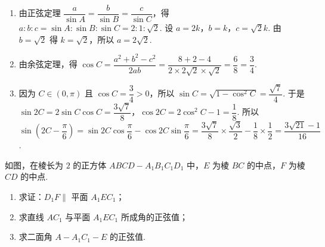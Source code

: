 \begin{solution}
\begin{enumerate}
\item 由正弦定理 \(\dfrac a{\sin A}=\dfrac b{\sin B}=\dfrac c{\sin C}\)，得 \(a:b:c=\sin A:\sin B:\sin C=2:1:\sqrt2\). 设 \(a=2k\)，\(b=k\)，\(c=\sqrt2k\). 由 \(b=\sqrt2\) 得 \(k=\sqrt2\)，所以 \(a=2\sqrt2\).

\item 由余弦定理，得 \(\cos C=\dfrac{a^2+b^2-c^2}{2ab}=\dfrac{8+2-4}{2\times2\sqrt2\times\sqrt2}=\dfrac68=\dfrac34\).

\item 因为 \(C\in(0,\pi)\) 且 \(\cos C=\dfrac34>0\)，所以 \(\sin C=\sqrt{1-\cos^2C}=\dfrac{\sqrt7}4\). 于是 \(\sin2C=2\sin C\cos C=\dfrac{3\sqrt7}8\)，\(\cos2C=2\cos^2C-1=\dfrac18\). 所以 \(\sin\left(2C-\dfrac{\pi}6\right)=\sin2C\cos\dfrac{\pi}6-\cos2C\sin\dfrac{\pi}6=\dfrac{3\sqrt7}8\times\dfrac{\sqrt3}2-\dfrac18\times\dfrac12=\dfrac{3\sqrt{21}-1}{16}\).
\end{enumerate}
\end{solution}

\begin{problem}
如图，在棱长为 \( 2 \) 的正方体 \( ABCD-A_1B_1C_1D_1 \) 中，\(E\) 为棱 \(BC\) 的中点，\(F\) 为棱 \(CD\) 的中点.

\begin{enumerate}
\item 求证：\( D_1F\parallel \) 平面 \(A_1EC_1\)；
\item 求直线 \(AC_1\) 与平面 \(A_1EC_1\) 所成角的正弦值；
\item 求二面角 \( A-A_1C_1-E \) 的正弦值.
\end{enumerate}

\end{problem}

